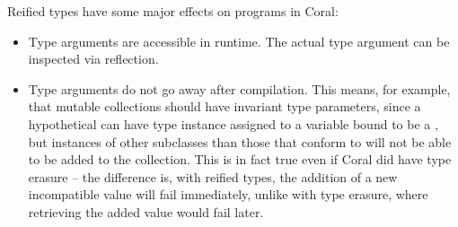 Reified types have some major effects on programs in Coral:
\begin{itemize}

\item Type arguments are accessible in runtime. The actual type argument can be inspected via reflection. 

\item Type arguments do not go away after compilation. This means, for example, that mutable collections should have invariant type parameters, since a hypothetical  can have type instance  assigned to a variable bound to be a , but instances of other subclasses than those that conform to  will not be able to be added to the collection. This is in fact true even if Coral did have type erasure -- the difference is, with reified types, the addition of a new incompatible value will fail immediately, unlike with type erasure, where retrieving the added value would fail later. 
\end{itemize}










